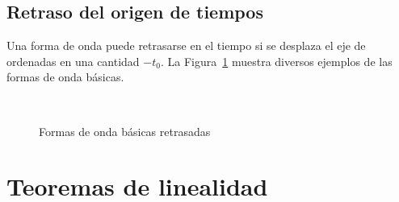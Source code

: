 \subsection{Retraso del origen de tiempos}
Una forma de onda puede retrasarse en el tiempo si se desplaza el eje
de ordenadas en una cantidad $-t_0$. La Figura~\ref{fig.retraso}
muestra diversos ejemplos de las formas de onda básicas.
\begin{figure}[H]
  \centering {}\hfil
  \\
  \hfil
  \caption{Formas de onda básicas retrasadas}
  \label{fig.retraso}
\end{figure}
	
	
\section{Teoremas de linealidad}
	

